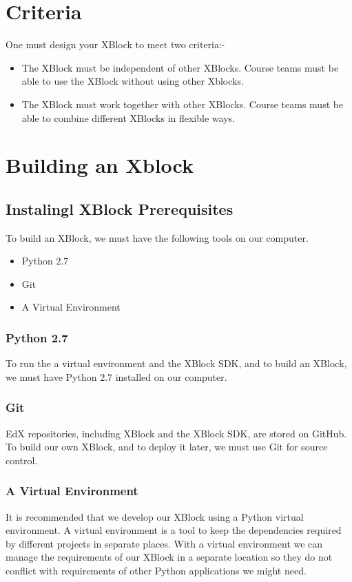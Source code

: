 \section{Criteria}
One must design your XBlock to meet two criteria:-
\begin{itemize}
\item The XBlock must be independent of other XBlocks. Course teams must be able to use the
XBlock without using other Xblocks.
\item The XBlock must work together with other XBlocks. Course teams must be able to combine
different XBlocks in flexible ways.
\end{itemize}

\section{Building an Xblock}
\subsection{Instalingl XBlock Prerequisites}
To build an XBlock, we must have the following tools on our computer.
\begin{itemize}
\item Python 2.7
\item Git
\item A Virtual Environment
\end{itemize}
\subsubsection{Python 2.7}
To run the a virtual environment and the XBlock SDK, and to build an XBlock, we must
have Python 2.7 installed on our computer.
\subsubsection{Git}
EdX repositories, including XBlock and the XBlock SDK, are stored on GitHub. To build
our own XBlock, and to deploy it later, we must use Git for source control.
\subsubsection{A Virtual Environment}
It is recommended that we develop our XBlock using a Python virtual environment. A
virtual environment is a tool to keep the dependencies required by different projects in
separate places. With a virtual environment we can manage the requirements of our XBlock
in a separate location so they do not conflict with requirements of other Python applications
we might need.

